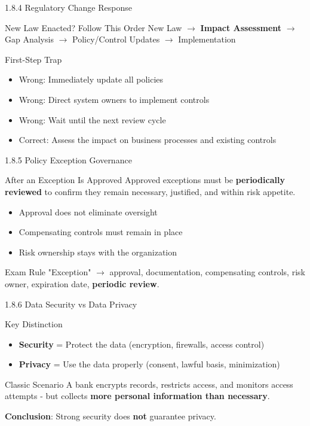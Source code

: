 \documentclass{beamer}
\begin{document}
	\begin{frame}{1.8.4 Regulatory Change Response}
		\begin{block}{New Law Enacted? Follow This Order}
			New Law $\rightarrow$ \textbf{Impact Assessment} $\rightarrow$ Gap Analysis $\rightarrow$ Policy/Control Updates $\rightarrow$ Implementation
		\end{block}
		\begin{alertblock}{First-Step Trap}
			\begin{itemize}
				\item Wrong: Immediately update all policies
				\item Wrong: Direct system owners to implement controls
				\item Wrong: Wait until the next review cycle
				\item Correct: Assess the impact on business processes and existing controls
			\end{itemize}
		\end{alertblock}
	\end{frame}
	
	\begin{frame}{1.8.5 Policy Exception Governance}
		\begin{block}{After an Exception Is Approved}
			Approved exceptions must be \textbf{periodically reviewed} to confirm they remain necessary, justified, and within risk appetite.
		\end{block}
		\begin{itemize}
			\item Approval does not eliminate oversight
			\item Compensating controls must remain in place
			\item Risk ownership stays with the organization
		\end{itemize}
		\begin{alertblock}{Exam Rule}
			"Exception" $\rightarrow$ approval, documentation, compensating controls, risk owner, expiration date, \textbf{periodic review}.
		\end{alertblock}
	\end{frame}
	
	\begin{frame}{1.8.6 Data Security vs Data Privacy}
		\begin{block}{Key Distinction}
			\begin{itemize}
				\item \textbf{Security} = Protect the data (encryption, firewalls, access control)
				\item \textbf{Privacy} = Use the data properly (consent, lawful basis, minimization)
			\end{itemize}
		\end{block}
		\begin{alertblock}{Classic Scenario}
			A bank encrypts records, restricts access, and monitors access attempts - but collects \textbf{more personal information than necessary}.
			
			\textbf{Conclusion}: Strong security does \textbf{not} guarantee privacy.
		\end{alertblock}
	\end{frame}
	
\end{document}
